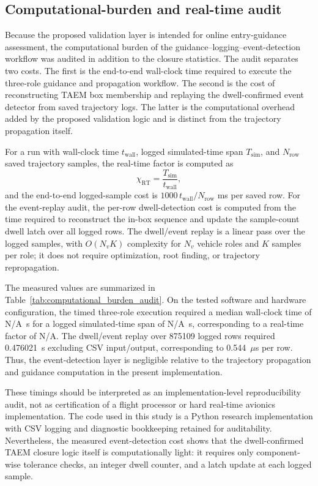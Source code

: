 \subsection{Computational-burden and real-time audit}
\label{subsec:computational_burden_audit}

Because the proposed validation layer is intended for online entry-guidance assessment, the computational burden of the guidance--logging--event-detection workflow was audited in addition to the closure statistics. The audit separates two costs. The first is the end-to-end wall-clock time required to execute the three-role guidance and propagation workflow. The second is the cost of reconstructing TAEM box membership and replaying the dwell-confirmed event detector from saved trajectory logs. The latter is the computational overhead added by the proposed validation logic and is distinct from the trajectory propagation itself.

For a run with wall-clock time \(t_{\mathrm{wall}}\), logged simulated-time span \(T_{\mathrm{sim}}\), and \(N_{\mathrm{row}}\) saved trajectory samples, the real-time factor is computed as
\[
\chi_{\mathrm{RT}}=\frac{T_{\mathrm{sim}}}{t_{\mathrm{wall}}},
\]
and the end-to-end logged-sample cost is \(1000\,t_{\mathrm{wall}}/N_{\mathrm{row}}\) ms per saved row. For the event-replay audit, the per-row dwell-detection cost is computed from the time required to reconstruct the in-box sequence and update the sample-count dwell latch over all logged rows. The dwell/event replay is a linear pass over the logged samples, with \(O(N_vK)\) complexity for \(N_v\) vehicle roles and \(K\) samples per role; it does not require optimization, root finding, or trajectory repropagation.

The measured values are summarized in Table~\ref{tab:computational_burden_audit}. On the tested software and hardware configuration, the timed three-role execution required a median wall-clock time of N/A~s for a logged simulated-time span of N/A~s, corresponding to a real-time factor of N/A. The dwell/event replay over 875109 logged rows required 0.476021~s excluding CSV input/output, corresponding to 0.544~\(\mu\)s per row. Thus, the event-detection layer is negligible relative to the trajectory propagation and guidance computation in the present implementation.

These timings should be interpreted as an implementation-level reproducibility audit, not as certification of a flight processor or hard real-time avionics implementation. The code used in this study is a Python research implementation with CSV logging and diagnostic bookkeeping retained for auditability. Nevertheless, the measured event-detection cost shows that the dwell-confirmed TAEM closure logic itself is computationally light: it requires only component-wise tolerance checks, an integer dwell counter, and a latch update at each logged sample.
